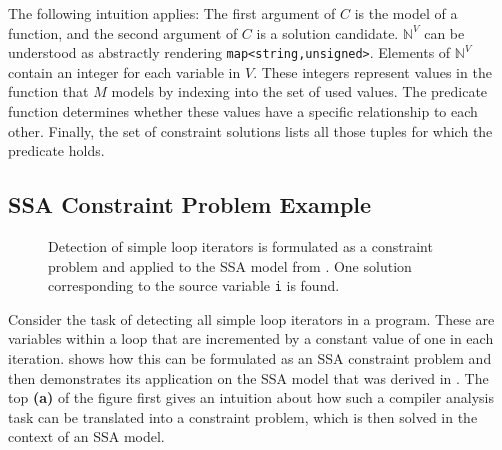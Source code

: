     The following intuition applies:
    The first argument of $C$ is the model of a function, and the second
    argument of $C$ is a solution candidate.
    $\mathbb N^V$ can be understood as abstractly rendering
    \lstinline[language=MyCpp]{map<string,unsigned>}.
    Elements of $\mathbb N^V$ contain an integer for each variable in $V$.
    These integers represent values in the function that $M$ models by
    indexing into the set of used values.
    The predicate function determines whether these values have a specific
    relationship to each other.
    Finally, the set of constraint solutions lists all those tuples for which
    the predicate holds.

\subsection{SSA Constraint Problem Example}

\begin{figure}[p]
    
\caption{Detection of simple loop iterators is formulated as a constraint
         problem and applied to the SSA model from .
         One solution corresponding to the source variable {\tt i} is found.}
\label{fig:constraintsolution}
\end{figure}

    Consider the task of detecting all simple loop iterators in a program.
    These are variables within a loop that are incremented by a constant value
    of one in each iteration.
     shows how this can be formulated as an
    SSA constraint problem and then demonstrates its application on the
    SSA model that was derived in .
    The top {\bf(a)} of the figure first gives an intuition about how such a
    compiler analysis task can be translated into a constraint problem, which is
    then solved in the context of an SSA model.

